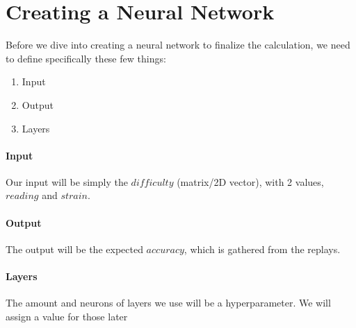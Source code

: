 

\section{Creating a Neural Network}

Before we dive into creating a neural network to finalize the calculation, we need to define specifically these few things:

\begin{enumerate}
	\item Input
	\item Output
	\item Layers
\end{enumerate}

\paragraph{Input} Our input will be simply the $difficulty$ (matrix/2D vector), with 2 values, $reading$ and $strain$.

\paragraph{Output} The output will be the expected $accuracy$, which is gathered from the replays.

\paragraph{Layers} The amount and neurons of layers we use will be a hyperparameter. We will assign a value for those later



